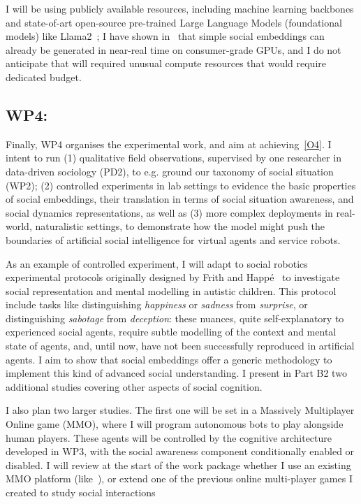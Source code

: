 I will be using publicly available resources, including machine learning
backbones and state-of-art open-source pre-trained Large Language Models
(foundational models) like Llama2~\cite{touvron2023llama}; I have shown
in~\cite{lemaignan2024social} that simple social embeddings can already
be generated in near-real time on consumer-grade GPUs, and I do not anticipate
that \project will required unusual compute resources that would require
dedicated budget.


\subsection{WP4: \textbf{\WPD} {\footnotesize{}}}

Finally, WP4 organises the experimental work, and aim at achieving~\ref{O4}. I
intent to run (1) qualitative field observations, supervised by one researcher
in data-driven sociology (PD2), to e.g. ground our taxonomy of social situation
(WP2); (2) controlled experiments in lab settings to evidence the basic
properties of social embeddings, their translation in terms of social situation
awareness, and social dynamics representations, as well as (3) more complex
deployments in real-world, naturalistic settings, to demonstrate how the
\project model might push the boundaries of artificial social intelligence for
virtual agents and service robots.

As an example of controlled experiment, I will adapt to social
robotics~\cite{lemaignan2015mutual} experimental protocols originally designed
by Frith and Happé~\cite{frith1994autism} to investigate social representation
and mental modelling in autistic children. This protocol include tasks like
distinguishing \emph{happiness} or \emph{sadness} from \emph{surprise}, or
distinguishing \emph{sabotage} from \emph{deception}: these nuances, quite
self-explanatory to experienced social agents, require subtle modelling of the
context and mental state of agents, and, until now, have not been successfully
reproduced in artificial agents. I aim to show that social embeddings offer a
generic methodology to implement this kind of advanced social understanding.  I
present in Part B2 two additional studies covering other aspects of social
cognition.

I also plan two larger studies. The first one will be set in a Massively
Multiplayer Online game (MMO), where I will program autonomous bots to play
alongside human players.  These agents will be controlled by the cognitive
architecture developed in WP3, with the social awareness component conditionally
enabled or disabled. I will review at the start of the work package whether I
use an existing MMO platform (like~\cite{schatten2017agents,tsoi2022sean}), or
extend one of the previous online multi-player games I created to study social
interactions~\cite{webb2022measuring,lemaignan2023officebots}

